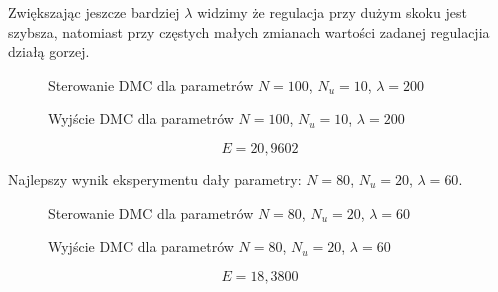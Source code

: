 Zwiększając jeszcze bardziej $\lambda$ widzimy że regulacja przy dużym skoku jest szybsza, natomiast przy częstych małych zmianach wartości zadanej regulacjia działą gorzej.

\begin{figure}[H]
\centering

\caption{Sterowanie DMC dla parametrów $N=100$, $N_u=10$, $\lambda=200$}
\end{figure}

\begin{figure}[H]
\centering

\caption{Wyjście DMC dla parametrów $N=100$, $N_u=10$, $\lambda=200$}
\end{figure}

\begin{equation}
E = 20,9602
\end{equation}

Najlepszy wynik eksperymentu dały parametry: $N=80$, $N_u=20$, $\lambda=60$.

\begin{figure}[H]
\centering

\caption{Sterowanie DMC dla parametrów $N=80$, $N_u=20$, $\lambda=60$}
\end{figure}

\begin{figure}[H]
\centering

\caption{Wyjście DMC dla parametrów $N=80$, $N_u=20$, $\lambda=60$}
\end{figure}

\begin{equation}
E = 18,3800
\end{equation}

